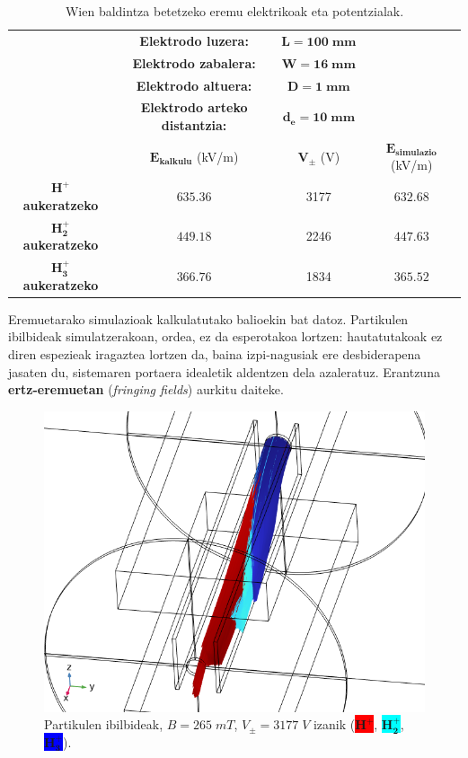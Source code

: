 \documentclass[12pt]{article}
\numberwithin{figure}{section}
\numberwithin{equation}{section}
\begin{document}
\begin{table}[h]
    \centering
    \caption{Wien baldintza betetzeko eremu elektrikoak eta potentzialak.}
    \begin{tabular}{cccc}
        & \textbf{Elektrodo luzera:} & $\mathbf{L=100\;mm}$ &\\
        & \textbf{Elektrodo zabalera:} & $\mathbf{W=16\;mm}$ &\\
        & \textbf{Elektrodo altuera:} & $\mathbf{D=1\;mm}$ &\\
        & \textbf{Elektrodo arteko distantzia:} & $\mathbf{d_e=10\;mm}$ &\\
        \midrule
        \rowcolor{gray!20}
        & $\mathbf{E_{kalkulu}}$ (kV/m) & $\mathbf{V_{\pm}}$ (V)&$\mathbf{E_{simulazio}}$ (kV/m)\\
        \midrule
        $\mathbf{H^+}$ \textbf{aukeratzeko} & $\num{635.36}$ & 3177 & $\num{632.68}$\\
        $\mathbf{H_2^+}$ \textbf{aukeratzeko} & $\num{449.18}$  & 2246 & $\num{447.63}$\\
        $\mathbf{H_3^+}$ \textbf{aukeratzeko} & $\num{366.76}$ & 1834 & $\num{365.52}$\\
        \bottomrule
    \end{tabular}
    \label{tab:eremue_balio}
\end{table}

Eremuetarako simulazioak kalkulatutako balioekin bat datoz. Partikulen ibilbideak simulatzerakoan, ordea, ez da esperotakoa lortzen: hautatutakoak ez diren espezieak iragaztea lortzen da, baina izpi-nagusiak ere desbiderapena jasaten du, sistemaren portaera idealetik aldentzen dela azaleratuz. Erantzuna \textbf{ertz-eremuetan} (\textit{fringing fields}) aurkitu daiteke.

\begin{figure}[h]
    \centering
    \includegraphics[width=0.6\linewidth]{4 - Diseinua/partikulak_ideal1.png}
    \caption{Partikulen ibilbideak, $B=265\;mT$, $V_\pm=3177\;V$ izanik (\colorbox{red}{$\mathbf{H_{ }^+}$}, \colorbox{cyan}{$\mathbf{H_2^+}$}, \colorbox{blue}{$\mathbf{H_3^+}$}).}
    \label{fig:partikulak_ideal1}
\end{figure}
\end{document}
